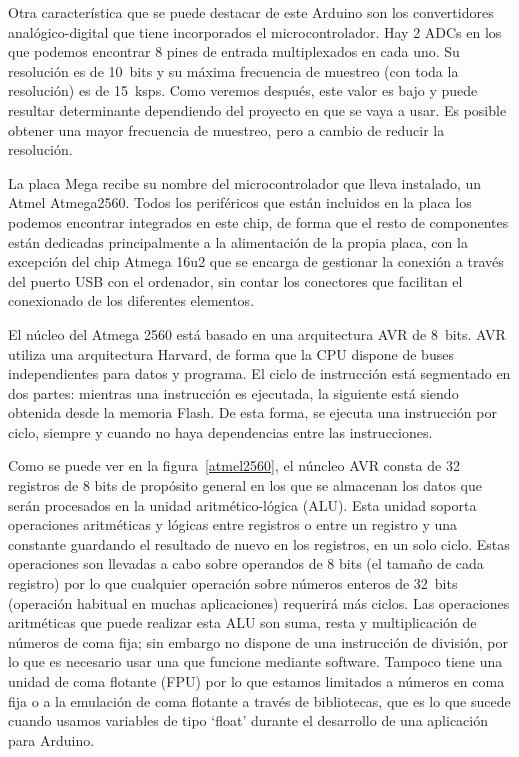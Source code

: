 Otra característica que se puede destacar de este Arduino son los convertidores analógico-digital que tiene incorporados el microcontrolador. Hay 2 ADCs en los que podemos encontrar 8 pines de entrada multiplexados en cada uno. Su resolución es de 10~bits y su máxima frecuencia de muestreo (con toda la resolución) es de 15~ksps. Como veremos después, este valor es bajo y puede resultar determinante dependiendo del proyecto en que se vaya a usar. Es posible obtener una mayor frecuencia de muestreo, pero a cambio de reducir la resolución.

La placa Mega recibe su nombre del microcontrolador que lleva instalado, un Atmel Atmega2560. Todos los periféricos que están incluidos en la placa los podemos encontrar integrados en este chip, de forma que el resto de componentes están dedicadas principalmente a la alimentación de la propia placa, con la excepción del chip Atmega 16u2 que se encarga de gestionar la conexión a través del puerto USB con el ordenador, sin contar los conectores que facilitan el conexionado de los diferentes elementos.

El núcleo del Atmega 2560 está basado en una arquitectura AVR de 8~bits. AVR utiliza una arquitectura Harvard, de forma que la CPU dispone de buses independientes para datos y programa. El ciclo de instrucción está segmentado en dos partes: mientras una instrucción es ejecutada, la siguiente está siendo obtenida desde la memoria Flash. De esta forma, se ejecuta una instrucción por ciclo, siempre y cuando no haya dependencias entre las instrucciones.


Como se puede ver en la figura~\ref{atmel2560}, el núncleo AVR consta de 32 registros de 8 bits de propósito general en los que se almacenan los datos que serán procesados en la unidad aritmético-lógica (ALU). Esta unidad soporta operaciones aritméticas y lógicas entre registros o entre un registro y una constante guardando el resultado de nuevo en los registros, en un solo ciclo. Estas operaciones son llevadas a cabo sobre operandos de 8 bits (el tamaño de cada registro) por lo que cualquier operación sobre números enteros de 32~bits (operación habitual en muchas aplicaciones) requerirá más ciclos. Las operaciones aritméticas que puede realizar esta ALU son suma, resta y multiplicación de números de coma fija; sin embargo no dispone de una instrucción de división, por lo que es necesario usar una que funcione mediante software. Tampoco tiene una unidad de coma flotante (FPU) por lo que estamos limitados a números en coma fija o a la emulación de coma flotante a través de bibliotecas, que es lo que sucede cuando usamos variables de tipo `float' durante el desarrollo de una aplicación para Arduino.

